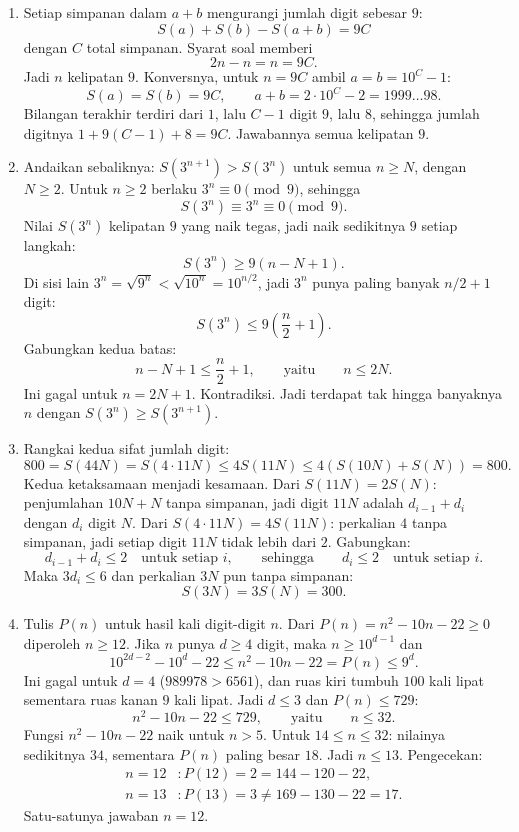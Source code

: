 \documentclass[12pt]{scrartcl}
\begin{document}
\begin{enumerate}[resume]
	\item Setiap simpanan dalam $a + b$ mengurangi jumlah digit sebesar $9$:
	\[ S(a) + S(b) - S(a + b) = 9C \]
	dengan $C$ total simpanan. Syarat soal memberi
	\[ 2n - n = n = 9C. \]
	Jadi $n$ kelipatan $9$.
	Konversnya, untuk $n = 9C$ ambil $a = b = 10^C - 1$:
	\[ S(a) = S(b) = 9C, \qquad a + b = 2 \cdot 10^C - 2 = 1999\dots98. \]
	Bilangan terakhir terdiri dari $1$, lalu $C - 1$ digit $9$, lalu $8$,
	sehingga jumlah digitnya $1 + 9(C-1) + 8 = 9C$.
	Jawabannya semua kelipatan $9$.

	\item Andaikan sebaliknya: $S(3^{n+1}) > S(3^n)$ untuk semua $n \ge N$,
	dengan $N \ge 2$.
	Untuk $n \ge 2$ berlaku $3^n \equiv 0 \pmod{9}$, sehingga
	\[ S(3^n) \equiv 3^n \equiv 0 \pmod{9}. \]
	Nilai $S(3^n)$ kelipatan $9$ yang naik tegas,
	jadi naik sedikitnya $9$ setiap langkah:
	\[ S(3^n) \ge 9(n - N + 1). \]
	Di sisi lain $3^n = \sqrt{9^n} < \sqrt{10^n} = 10^{n/2}$,
	jadi $3^n$ punya paling banyak $n/2 + 1$ digit:
	\[ S(3^n) \le 9\left(\frac{n}{2} + 1\right). \]
	Gabungkan kedua batas:
	\[ n - N + 1 \le \frac{n}{2} + 1, \qquad \text{yaitu} \qquad n \le 2N. \]
	Ini gagal untuk $n = 2N + 1$. Kontradiksi.
	Jadi terdapat tak hingga banyaknya $n$ dengan $S(3^n) \ge S(3^{n+1})$.

	\item Rangkai kedua sifat jumlah digit:
	\[ 800 = S(44N) = S(4 \cdot 11N) \le 4S(11N) \le 4(S(10N) + S(N)) = 800. \]
	Kedua ketaksamaan menjadi kesamaan.
	Dari $S(11N) = 2S(N)$: penjumlahan $10N + N$ tanpa simpanan,
	jadi digit $11N$ adalah $d_{i-1} + d_i$ dengan $d_i$ digit $N$.
	Dari $S(4 \cdot 11N) = 4S(11N)$: perkalian $4$ tanpa simpanan,
	jadi setiap digit $11N$ tidak lebih dari $2$.
	Gabungkan:
	\[ d_{i-1} + d_i \le 2 \quad \text{untuk setiap } i,
	\qquad \text{sehingga} \qquad d_i \le 2 \quad \text{untuk setiap } i. \]
	Maka $3d_i \le 6$ dan perkalian $3N$ pun tanpa simpanan:
	\[ S(3N) = 3S(N) = 300. \]

	\item Tulis $P(n)$ untuk hasil kali digit-digit $n$.
	Dari $P(n) = n^2 - 10n - 22 \ge 0$ diperoleh $n \ge 12$.
	Jika $n$ punya $d \ge 4$ digit, maka $n \ge 10^{d-1}$ dan
	\[ 10^{2d-2} - 10^d - 22 \le n^2 - 10n - 22 = P(n) \le 9^d. \]
	Ini gagal untuk $d = 4$ ($989978 > 6561$),
	dan ruas kiri tumbuh $100$ kali lipat sementara ruas kanan $9$ kali lipat.
	Jadi $d \le 3$ dan $P(n) \le 729$:
	\[ n^2 - 10n - 22 \le 729, \qquad \text{yaitu} \qquad n \le 32. \]
	Fungsi $n^2 - 10n - 22$ naik untuk $n > 5$.
	Untuk $14 \le n \le 32$: nilainya sedikitnya $34$,
	sementara $P(n)$ paling besar $18$.
	Jadi $n \le 13$. Pengecekan:
	\begin{align*}
	n = 12 &: P(12) = 2 = 144 - 120 - 22, \\
	n = 13 &: P(13) = 3 \ne 169 - 130 - 22 = 17.
	\end{align*}
	Satu-satunya jawaban $n = 12$.


\end{enumerate}
\end{document}
